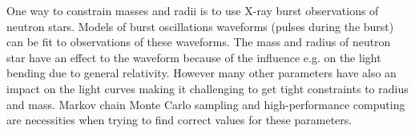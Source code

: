 \documentclass{wihuri}
\begin{document}
One way to constrain masses and radii is to use X-ray burst observations of neutron stars. Models of burst oscillations waveforms (pulses during the burst) can be fit to observations of these waveforms. The mass and radius of neutron star have an effect to the waveform because of the influence e.g. on the light bending due to general relativity. However many other parameters have also an impact on the light curves making it challenging to get tight constraints to radius and mass. Markov chain Monte Carlo sampling and high-performance computing are necessities when trying to find correct values for these parameters. 








\vspace{10cm}











\iffalse 
\end{document}
